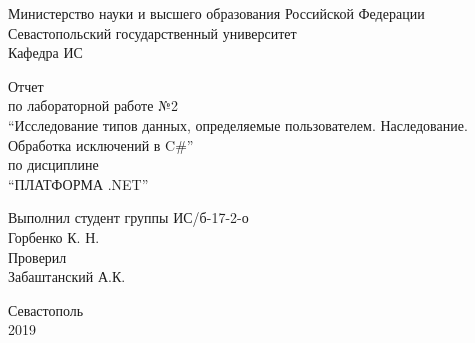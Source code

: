 \documentclass[a4paper,14pt]{extarticle}
\newcommand{\mylabnumber}{2}
\newcommand{\mylabtitle}{Исследование типов данных, определяемые пользователем. Наследование. Обработка исключений в C\#}
\newcommand{\mysubject}{Платформа .NET}
\newcommand{\mylecturer}{Забаштанский А.К.}
\begin{document}
    \lstset{ %
        basicstyle=\footnotesize\ttfamily,
        breaklines=true,
        numbersep=5pt,
        tabsize=4,
        gobble=8,
        extendedchars=\true,
        keepspaces=\true,
        numbers=left,
        stringstyle=\ttfamily,
        showstringspaces=\false
    }


    \begin{titlepage}
        
        \thispagestyle{empty}
        
        \begin{center}
            
            Министерство науки и высшего образования Российской Федерации \\
            Севастопольский государственный университет \\
            Кафедра ИС
            
            \vfill

            Отчет \\
            по лабораторной работе №\mylabnumber \\
            \enquote{\mylabtitle} \\
            по дисциплине \\
            \enquote{\MakeTextUppercase{\mysubject}}

        \end{center}

        \vspace{1cm}

        \noindent\hspace{7.5cm} Выполнил студент группы ИС/б-17-2-о \\
        \null\hspace{7.5cm} Горбенко К. Н. \\
        \null\hspace{7.5cm} Проверил \\
        \null\hspace{7.5cm} \mylecturer

        \vfill

        \begin{center}
            Севастополь \\
            2019
        \end{center}

    \end{titlepage}
\end{document}
